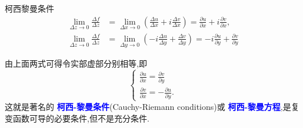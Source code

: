 \documentclass[fontset=windows, chinese, 10pt]{beamer}
\newcommand{\blue}[1]{\textcolor{blue}{#1}}
\begin{document}
\begin{frame}{柯西黎曼条件}
  \begin{align*}
    \lim _{\Delta z \rightarrow 0} \frac{\Delta f}{\Delta z} &=\lim _{\Delta x \rightarrow 0}\left(\frac{\Delta u}{\Delta x}+i \frac{\Delta v}{\Delta x}\right)=\frac{\partial u}{\partial x}+i \frac{\partial v}{\partial x},
\\
    \lim _{\Delta z \rightarrow 0} \frac{\Delta f}{\Delta z} &=\lim _{\Delta y \rightarrow 0}\left(-i \frac{\Delta u}{\Delta y}+\frac{\Delta v}{\Delta y}\right)=-i \frac{\partial u}{\partial y}+\frac{\partial v}{\partial y}
\end{align*}

  由上面两式可得令实部虚部分别相等,即
\begin{equation}
    \begin{cases}
        \frac{\partial u}{\partial x}=\frac{\partial v}{\partial y} \\
        \frac{\partial v}{\partial x}=-\frac{\partial u}{\partial y} .
    \end{cases}
\end{equation}
这就是著名的\blue{ \textbf{ 柯西-黎曼条件}}(Cauchy-Riemann conditions)或
\blue{\bf 柯西-黎曼方程},是复变函数可导的必要条件,但不是充分条件.

\end{frame}
\end{document}
